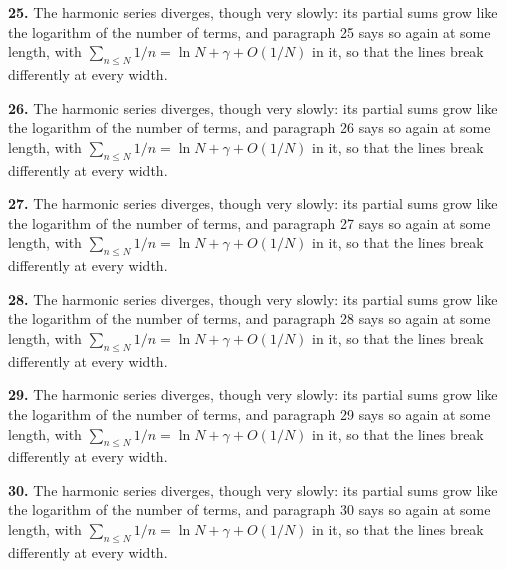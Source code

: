 \noindent\textbf{25.} The harmonic series diverges, though very slowly: its partial sums
grow like the logarithm of the number of terms, and paragraph 25 says so again
at some length, with $\sum_{n \le N} 1/n = \ln N + \gamma + O(1/N)$ in it,
so that the lines break differently at every width.

\noindent\textbf{26.} The harmonic series diverges, though very slowly: its partial sums
grow like the logarithm of the number of terms, and paragraph 26 says so again
at some length, with $\sum_{n \le N} 1/n = \ln N + \gamma + O(1/N)$ in it,
so that the lines break differently at every width.

\noindent\textbf{27.} The harmonic series diverges, though very slowly: its partial sums
grow like the logarithm of the number of terms, and paragraph 27 says so again
at some length, with $\sum_{n \le N} 1/n = \ln N + \gamma + O(1/N)$ in it,
so that the lines break differently at every width.

\noindent\textbf{28.} The harmonic series diverges, though very slowly: its partial sums
grow like the logarithm of the number of terms, and paragraph 28 says so again
at some length, with $\sum_{n \le N} 1/n = \ln N + \gamma + O(1/N)$ in it,
so that the lines break differently at every width.

\noindent\textbf{29.} The harmonic series diverges, though very slowly: its partial sums
grow like the logarithm of the number of terms, and paragraph 29 says so again
at some length, with $\sum_{n \le N} 1/n = \ln N + \gamma + O(1/N)$ in it,
so that the lines break differently at every width.

\noindent\textbf{30.} The harmonic series diverges, though very slowly: its partial sums
grow like the logarithm of the number of terms, and paragraph 30 says so again
at some length, with $\sum_{n \le N} 1/n = \ln N + \gamma + O(1/N)$ in it,
so that the lines break differently at every width.

